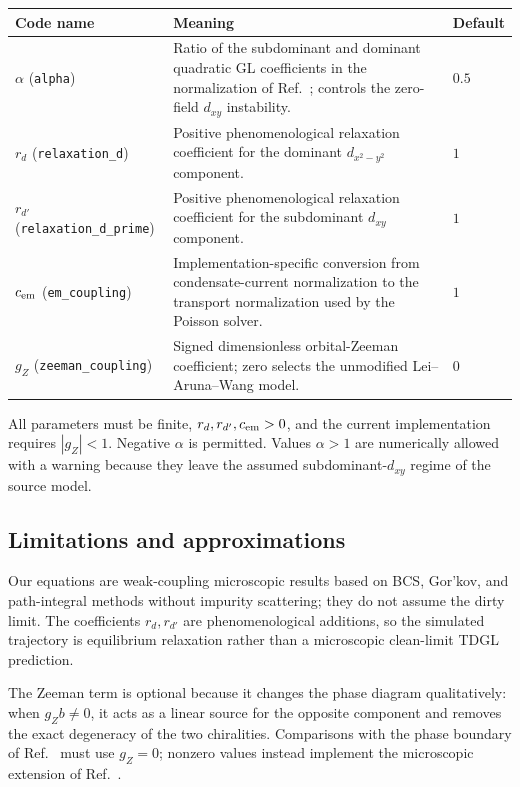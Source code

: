\documentclass[11pt]{article}
\begin{document}
{\small
\begin{longtable}{@{}p{}p{}p{}@{}}
\toprule
Code name & Meaning & Default\\
\midrule
\endhead
$\alpha$ (\texttt{alpha}) & Ratio of the subdominant and dominant quadratic GL coefficients in the normalization of Ref.~\cite{Lei2000}; controls the zero-field $d_{xy}$ instability. & $0.5$\\
$r_d$ (\texttt{relaxation\_d}) & Positive phenomenological relaxation coefficient for the dominant $d_{x^2-y^2}$ component. & $1$\\
$r_{d'}$ (\texttt{relaxation\_d\_prime}) & Positive phenomenological relaxation coefficient for the subdominant $d_{xy}$ component. & $1$\\
$c_{\rm em}$ (\texttt{em\_coupling}) & Implementation-specific conversion from condensate-current normalization to the transport normalization used by the Poisson solver. & $1$\\
$g_Z$ (\texttt{zeeman\_coupling}) & Signed dimensionless orbital-Zeeman coefficient; zero selects the unmodified Lei--Aruna--Wang model. & $0$\\
\bottomrule
\end{longtable}
}

All parameters must be finite, $r_d,r_{d'},c_{\rm em}>0$, and the current
implementation requires $|g_Z|<1$.  Negative $\alpha$ is permitted.  Values
$\alpha>1$ are numerically allowed with a warning because they leave the
assumed subdominant-$d_{xy}$ regime of the source model.

\subsection{Limitations and approximations}

Our equations are weak-coupling microscopic results based on BCS, Gor'kov, and path-integral
methods without impurity scattering; they do not assume the dirty limit.  The
coefficients $r_d,r_{d'}$ are phenomenological additions, so the simulated
trajectory is equilibrium relaxation rather than a microscopic clean-limit
TDGL prediction.

The Zeeman term is optional because it changes the phase diagram qualitatively:
when $g_Zb\ne0$, it acts as a linear source for the opposite component and
removes the exact degeneracy of the two chiralities.  Comparisons with the
phase boundary of Ref.~\cite{Lei2000} must use $g_Z=0$; nonzero values instead
implement the microscopic extension of Ref.~\cite{Wang1999Orbital}.
\end{document}
